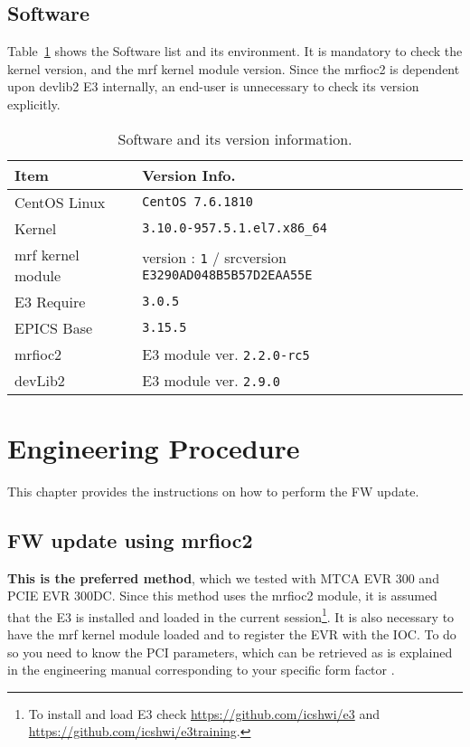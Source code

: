 \documentclass[11pt
  , a4paper
  , article
  , oneside
  , showtrims
]{memoir}
\begin{document}
\section{Software}
Table~\ref{table:swlist} shows the Software list and its environment. It is mandatory to check the kernel version, and the mrf kernel module version. Since the mrfioc2 is dependent upon devlib2 E3 internally, an end-user is unnecessary to check its version explicitly.
\begin{table}[!htb]
  \centering
  \begin{tabular}{l|l}
    \toprule
    Item               & Version Info.                                                      \\\midrule
    CentOS Linux       & \texttt{CentOS 7.6.1810}                                           \\\midrule
    Kernel             & \texttt{3.10.0-957.5.1.el7.x86\_64}                                 \\\midrule
    mrf kernel module  & version : \texttt{1} / srcversion \texttt{E3290AD048B5B57D2EAA55E} \\\midrule
    E3 Require         & \texttt{3.0.5}                                                     \\\midrule
    EPICS Base         & \texttt{3.15.5}                                                    \\\midrule
    mrfioc2            & E3 module ver. \texttt{2.2.0-rc5}                                  \\\midrule
    devLib2            & E3 module ver. \texttt{2.9.0}                                      \\\bottomrule
  \end{tabular}
  \caption[]{Software and its version information.}
  \label{table:swlist}
\end{table}


\clearpage
\chapter{Engineering Procedure}
This chapter provides the instructions on how to perform the FW update.


\section{FW update using mrfioc2}
\textbf{This is the preferred method}, which we tested with MTCA EVR 300 and PCIE EVR 300DC. Since this method uses the mrfioc2 module, it is assumed that the E3 is installed and loaded in the current session{\footnote{To install and load E3 check \url{https://github.com/icshwi/e3} and \url{https://github.com/icshwi/e3training}.}}. It is also necessary to have the mrf kernel module loaded and to register the EVR with the IOC. To do so you need to know the PCI parameters, which can be retrieved as is explained in the engineering manual corresponding to your specific form factor \cite{empcieeevr300dc, emmtcaevr300}.
\end{document}
